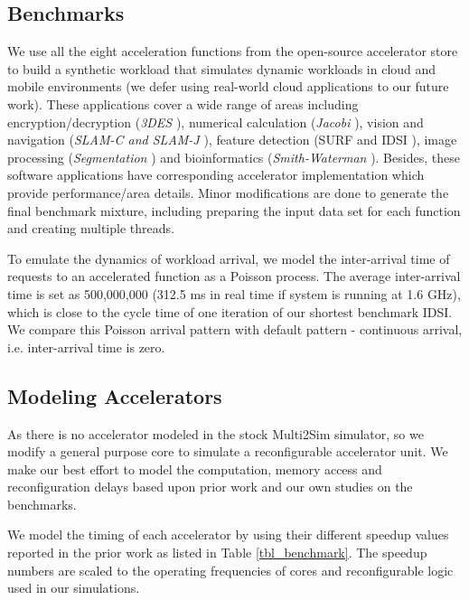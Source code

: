 \subsection{Benchmarks}
We use all the eight acceleration functions from the
open-source accelerator store \cite{accstore} to build a synthetic
workload that simulates dynamic workloads in cloud and mobile
environments (we defer using real-world cloud applications to our
future work).  These applications cover a wide range of areas
including encryption/decryption ({\em 3DES} \cite{openssl}), numerical
calculation ({\em Jacobi} \cite{jacobi-wiki}), vision and navigation
({\em SLAM-C and SLAM-J} \cite{openslam}), feature detection (SURF and
IDSI \cite{opencv}), image processing ({\em Segmentation}
\cite{segmentation-wiki}) and bioinformatics ({\em Smith-Waterman}
\cite{smithwaterman-wiki}). Besides, these software applications have
corresponding accelerator implementation which provide
performance/area details. Minor modifications are done to generate the
final benchmark mixture, including preparing the input data set for
each function and creating multiple threads.

To emulate the dynamics of workload arrival, we model the inter-arrival time of
requests to an accelerated function as a Poisson process. The average
inter-arrival time is set as 500,000,000 (312.5 ms
in real time if system is running at 1.6 GHz), which is close to the
cycle time of one iteration of our shortest benchmark IDSI. We compare
this Poisson arrival pattern with default pattern - continuous
arrival, i.e. inter-arrival time is zero.

\subsection{Modeling Accelerators}
As there is no accelerator modeled in the stock Multi2Sim simulator,
so we modify a general purpose core to simulate a reconfigurable
accelerator unit. We make our best effort to model the
computation, memory access and reconfiguration delays  based
upon prior work and our own studies on the benchmarks. 

We model the timing of each accelerator by using their different
speedup values reported in the prior work as listed in Table
\ref{tbl_benchmark}. The speedup numbers are scaled to the 
operating frequencies of cores and reconfigurable logic used in our
simulations. 

